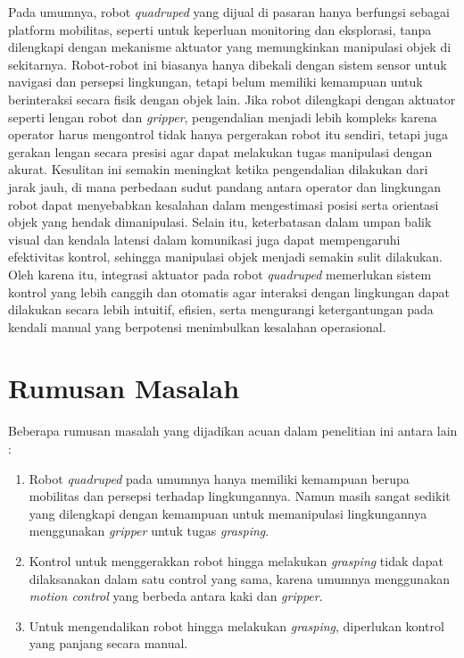 Pada umumnya, robot \emph{quadruped} yang dijual di pasaran hanya berfungsi sebagai platform mobilitas,
seperti untuk keperluan monitoring dan eksplorasi, tanpa dilengkapi dengan mekanisme aktuator
yang memungkinkan manipulasi objek di sekitarnya. Robot-robot ini biasanya hanya dibekali
dengan sistem sensor untuk navigasi dan persepsi lingkungan, tetapi belum memiliki kemampuan
untuk berinteraksi secara fisik dengan objek lain. Jika robot dilengkapi dengan aktuator
seperti lengan robot dan \emph{gripper}, pengendalian menjadi lebih kompleks karena operator harus
mengontrol tidak hanya pergerakan robot itu sendiri, tetapi juga gerakan lengan secara presisi
agar dapat melakukan tugas manipulasi dengan akurat. Kesulitan ini semakin meningkat ketika
pengendalian dilakukan dari jarak jauh, di mana perbedaan sudut pandang
antara operator dan lingkungan robot dapat menyebabkan kesalahan dalam mengestimasi posisi serta
orientasi objek yang hendak dimanipulasi. Selain itu, keterbatasan dalam umpan balik visual
dan kendala latensi dalam komunikasi juga dapat mempengaruhi efektivitas kontrol,
sehingga manipulasi objek menjadi semakin sulit dilakukan. Oleh karena itu, integrasi aktuator
pada robot \emph{quadruped} memerlukan sistem kontrol yang lebih canggih dan otomatis agar
interaksi dengan lingkungan dapat dilakukan secara lebih intuitif, efisien, serta
mengurangi ketergantungan pada kendali manual yang berpotensi menimbulkan kesalahan operasional.

\section{Rumusan Masalah}

Beberapa rumusan masalah yang dijadikan acuan dalam penelitian ini antara lain :

\begin{enumerate}
    \item Robot \emph{quadruped} pada umumnya hanya memiliki kemampuan berupa mobilitas
    dan persepsi terhadap lingkungannya. Namun masih sangat sedikit yang dilengkapi
    dengan kemampuan untuk memanipulasi lingkungannya menggunakan \emph{gripper} untuk tugas \emph{grasping}.
    \item Kontrol untuk menggerakkan robot hingga melakukan \emph{grasping} tidak dapat dilaksanakan dalam
    satu control yang sama, karena umumnya menggunakan \emph{motion control} yang berbeda antara kaki dan \emph{gripper}.
    \item Untuk mengendalikan robot hingga melakukan \emph{grasping}, diperlukan kontrol yang panjang secara manual.

\end{enumerate}

